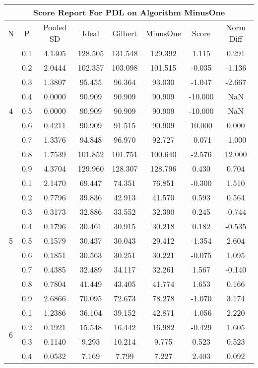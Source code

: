 \documentclass[11pt,a4paper]{report}
\begin{document}
\begin{longtable}{ | c | c || c | c | c | c | c | c | }
\hline
\multicolumn{8}{|c|}{ Score Report For PDL on Algorithm MinusOne} \\
\hline
N & P & Pooled SD &  Ideal &  Gilbert & MinusOne  & Score & Norm Diff \\
 \hline
 \hline
 \endhead
\multirow{9}{*}{4} & 0.1 & 4.1305 & 128.505 & 131.548 & 129.392 & 1.115 & 0.291 \\
 & 0.2 & 2.0444 & 102.357 & 103.098 & 101.515 & -0.035 & -1.136 \\
 & 0.3 & 1.3807 & 95.455 & 96.364 & 93.030 & -1.047 & -2.667 \\
 & 0.4 & 0.0000 & 90.909 & 90.909 & 90.909 & -10.000 & NaN \\
 & 0.5 & 0.0000 & 90.909 & 90.909 & 90.909 & -10.000 & NaN \\
 & 0.6 & 0.4211 & 90.909 & 91.515 & 90.909 & 10.000 & 0.000 \\
 & 0.7 & 1.3376 & 94.848 & 96.970 & 92.727 & -0.071 & -1.000 \\
 & 0.8 & 1.7539 & 101.852 & 101.751 & 100.640 & -2.576 & 12.000 \\
 & 0.9 & 4.3704 & 129.960 & 128.307 & 128.796 & 0.430 & 0.704 \\
 \hline
\multirow{9}{*}{5} & 0.1 & 2.1470 & 69.447 & 74.351 & 76.851 & -0.300 & 1.510 \\
 & 0.2 & 0.7796 & 39.836 & 42.913 & 41.570 & 0.593 & 0.564 \\
 & 0.3 & 0.3173 & 32.886 & 33.552 & 32.390 & 0.245 & -0.744 \\
 & 0.4 & 0.1796 & 30.461 & 30.915 & 30.218 & 0.182 & -0.535 \\
 & 0.5 & 0.1579 & 30.437 & 30.043 & 29.412 & -1.354 & 2.604 \\
 & 0.6 & 0.1851 & 30.563 & 30.251 & 30.221 & -0.075 & 1.095 \\
 & 0.7 & 0.4385 & 32.489 & 34.117 & 32.261 & 1.567 & -0.140 \\
 & 0.8 & 0.7804 & 41.449 & 43.405 & 41.774 & 1.653 & 0.166 \\
 & 0.9 & 2.6866 & 70.095 & 72.673 & 78.278 & -1.070 & 3.174 \\
 \hline
\multirow{9}{*}{6} & 0.1 & 1.2386 & 36.104 & 39.152 & 42.871 & -1.056 & 2.220 \\
 & 0.2 & 0.1921 & 15.548 & 16.442 & 16.982 & -0.429 & 1.605 \\
 & 0.3 & 0.1140 & 9.293 & 10.214 & 9.775 & 0.523 & 0.523 \\
 & 0.4 & 0.0532 & 7.169 & 7.799 & 7.227 & 2.403 & 0.092 \\

\end{longtable}
\end{document}
